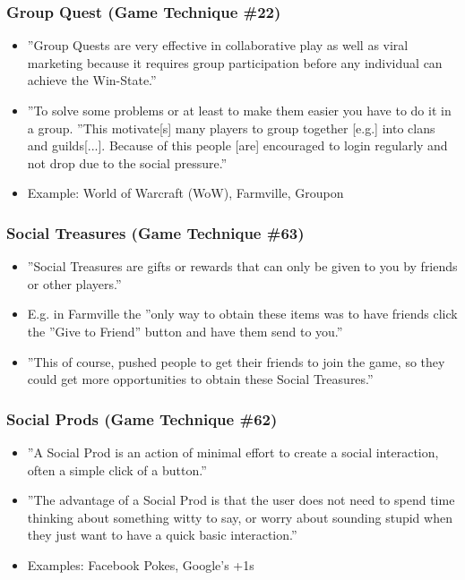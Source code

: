 \subsubsection{Group Quest (Game Technique \#22)}
    \begin{itemize}
        \item ''Group Quests are very effective in collaborative play as well as viral marketing because it requires group participation before any individual can achieve the Win-State.''
        \item ''To solve some problems or at least to make them easier you have to do it in a group. ''This motivate[s] many players to group together [e.g.] into clans and guilds[...]. Because of this people [are] encouraged to login regularly and not drop due to the social pressure.''  
        \item Example: World of Warcraft (WoW), Farmville, Groupon
    \end{itemize}
    
\subsubsection{Social Treasures (Game Technique \#63)}
    \begin{itemize}
        \item ''Social Treasures are gifts or rewards that can only be given to you by friends or other players.''
        \item E.g. in Farmville the ''only way to obtain these items was to have friends click the ''Give to Friend'' button and have them send to you.''
        \item ''This of course, pushed people to get their friends to join the game, so they could get more opportunities to obtain these Social Treasures.''
    \end{itemize}
    
\subsubsection{Social Prods (Game Technique \#62)}
    \begin{itemize}
        \item ''A Social Prod is an action of minimal effort to create a social interaction, often a simple click of a button.''
        \item ''The advantage of a Social Prod is that the user does not need to spend time thinking about something witty to say, or worry about sounding stupid when they just want to have a quick basic interaction.''
        \item Examples: Facebook Pokes, Google's +1s
    \end{itemize}
    
